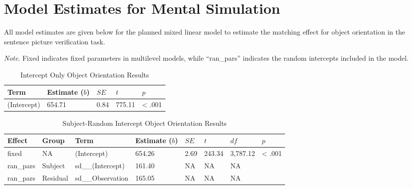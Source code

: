 \documentclass[
  man,floatsintext]{apa7}
\begin{document}
\hypertarget{model-estimates-for-mental-simulation}{%
\section{Model Estimates for Mental Simulation}\label{model-estimates-for-mental-simulation}}

All model estimates are given below for the planned mixed linear model to estimate the matching effect for object orientation in the sentence picture verification task.

\emph{Note}. Fixed indicates fixed parameters in multilevel models, while ``ran\_pars'' indicates the random intercepts included in the model.

\newpage

\begin{table}[tbp]

\begin{center}
\begin{threeparttable}

\caption{\label{tab:intercept}Intercept Only Object Orientation Results}

\begin{tabular}{lllll}
\toprule
Term & Estimate ($b$) & $SE$ & $t$ & $p$\\
\midrule
(Intercept) & 654.71 & 0.84 & 775.11 & < .001\\
\bottomrule
\end{tabular}

\end{threeparttable}
\end{center}

\end{table}

\begin{table}[tbp]

\begin{center}
\begin{threeparttable}

\caption{\label{tab:subject}Subject-Random Intercept Object Orientation Results}

\begin{tabular}{llllllll}
\toprule
Effect & Group & Term & Estimate ($b$) & $SE$ & $t$ & $df$ & $p$\\
\midrule
fixed & NA & (Intercept) & 654.26 & 2.69 & 243.34 & 3,787.12 & < .001\\
ran\_pars & Subject & sd\_\_(Intercept) & 161.40 & NA & NA & NA & \\
ran\_pars & Residual & sd\_\_Observation & 165.05 & NA & NA & NA & \\
\bottomrule
\end{tabular}

\end{threeparttable}
\end{center}

\end{table}
\end{document}
